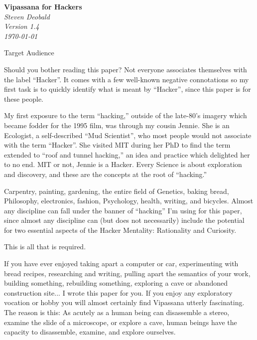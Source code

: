 \documentclass{article}
\begin{document}
\begin{titlepage}
   \begin{center}
     \Huge\textbf{Vipassana for Hackers}\\
     \vspace{5cm}
     \large\textit{Steven Deobald}\\
     \large\textit{Version 1.4}\\
     \large\textit\today
   \end{center}
\end{titlepage}

\begin{center}
  \Huge{Target Audience}
\end{center}

Should you bother reading this paper? Not everyone associates themselves with the label ``Hacker''. It comes with a few well-known negative connotations so my first task is to quickly identify what is meant by ``Hacker'', since this paper is for these people.

My first exposure to the term ``hacking,'' outside of the late-80's imagery which became fodder for the 1995 film, was through my cousin Jennie. She is an Ecologist, a self-described ``Mud Scientist'', who most people would not associate with the term ``Hacker''. She visited MIT during her PhD to find the term extended to ``roof and tunnel hacking,'' an idea and practice which delighted her to no end. MIT or not, Jennie is a Hacker. Every Science is about exploration and discovery, and these are the concepts at the root of ``hacking.''

Carpentry, painting, gardening, the entire field of Genetics, baking bread, Philosophy, electronics, fashion, Psychology, health, writing, and bicycles. Almost any discipline can fall under the banner of ``hacking'' I'm using for this paper, since almost any discipline can (but does not necessarily) include the potential for two essential aspects of the Hacker Mentality: Rationality and Curiosity.

This is all that is required.

If you have ever enjoyed taking apart a computer or car, experimenting with bread recipes, researching and writing, pulling apart the semantics of your work, building something, rebuilding something, exploring a cave or abandoned construction site... I wrote this paper for you. If you enjoy any exploratory vocation or hobby you will almost certainly find Vipassana utterly fascinating. The reason is this: As acutely as a human being can disassemble a stereo, examine the slide of a microscope, or explore a cave, human beings have the capacity to disassemble, examine, and explore ourselves.
\end{document}
